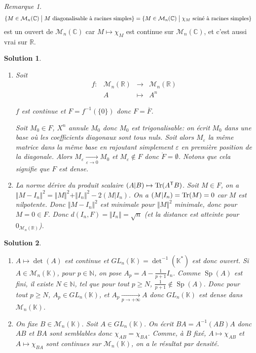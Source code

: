 \documentclass[12pt]{article}
\newtheorem{solution}{Solution}[section]
\theoremstyle{remark}
\newtheorem{remark}{Remarque}[section]
\newcommand{\K}{\mathbb{K}} \newcommand{\R}{\mathbb{R}}
\newcommand{\C}{\mathbb{C}} \newcommand{\Q}{\mathbb{Q}}
\newcommand{\N}{\mathbb{N}} \newcommand{\Z}{\mathbb{Z}}
\newcommand{\M}{\mathcal{M}} \renewcommand{\L}{\mathcal{L}}
\DeclareMathOperator{\Sp}{Sp} \DeclareMathOperator{\mat}{mat}
\newcommand{\function}[5]{
	$$
	\begin{array}{rccl}
		#1: & #2 & \to & #3 \\
		& #4 & \mapsto & #5
	\end{array}
	$$
}
\begin{document}
\begin{remark}
	$$\{M\in\M_{n}(\C)\bigm|M\text{ diagonalisable à racines simples}\}=\{M\in\M_{n}(\C)\bigm|\chi_M\text{ sciné à racines simples}\}$$
	est un ouvert de $\M_{n}(\C)$ car $M\mapsto\chi_{M}$ est continue sur $\M_{n}(\C)$, et c'est aussi vrai sur $\R$.
\end{remark}

\begin{solution}
	\phantom{}
	\begin{enumerate}
		\item Soit \function{f}{\M_n(\R)}{\M_n(\R)}{A}{A^{n}}
		$f$ est continue et $F=f^{-1}(\{0\})$ donc $F=\overline{F}$.

		Soit $M_{0}\in F$, $X^{n}$ annule $M_{0}$ donc $M_{0}$ est trigonalisable: on écrit $M_{0}$ dans une base où les coefficients diagonaux sont tous nuls. Soit alors $M_{\varepsilon}$ la même matrice dans la même base en rajoutant simplement $\varepsilon$ en première position de la diagonale. Alors $M_{\varepsilon}\xrightarrow[\varepsilon\to0]{}M_{0}$ et $M_{\varepsilon}\notin F$ donc $\mathring{F}=\emptyset$. Notons que cela signifie que $F$ est dense.

		\item La norme dérive du produit scalaire $(A|B)\mapsto\operatorname{Tr}(A^{\mathsf{T}}B)$. Soit $M\in F$, on a $\Vert M-I_{n}\Vert^{2}=\Vert M\Vert^{2}+\Vert I_{n}\Vert^{2}-2(M|I_{n})$. On a $(M|I_{n})=\operatorname{Tr}(M)=0$ car $M$ est nilpotente. Donc $\Vert M-I_{n}\Vert^{2}$ est minimale pour $\Vert M\Vert^{2}$ minimale, donc pour $M=0\in F$. Donc $d(I_{n},F)=\Vert I_{n}\Vert=\sqrt{n}$ (et la distance est atteinte pour $0_{\M_n(\R)}$).
	\end{enumerate}
\end{solution}

\begin{solution}
	\phantom{}
	\begin{enumerate}
		\item $A\mapsto\det(A)$ est continue et $GL_{n}(\K)=\det^{-1}(\K^{*})$ est donc ouvert. Si $A\in\M_{n}(\K)$, pour $p\in\N$, on pose $A_{p}=A-\frac{1}{p+1}I_{n}$. Comme $\Sp(A)$ est fini, il existe $N\in\N$, tel que pour tout $p\geqslant N$, $\frac{1}{p+1}\notin\Sp(A)$. Donc pour tout $p\geqslant N$, $A_{p}\in GL_{n}(\K)$, et $A_{p}\xrightarrow[p\to+\infty]{}A$ donc $GL_{n}(\K)$ est dense dans $\M_{n}(\K)$.
		\item On fixe $B\in\M_{n}(\K)$. Soit $A\in GL_{n}(\K)$. On écrit $BA=A^{-1}(AB)A$ donc $AB$ et $BA$ sont semblables donc $\chi_{AB}=\chi_{BA}$. Comme, à $B$ fixé, $A\mapsto\chi_{AB}$ et $A\mapsto\chi_{BA}$ sont continues sur $\M_{n}(\K)$, on a le résultat par densité.
	\end{enumerate}
\end{solution}
\end{document}
